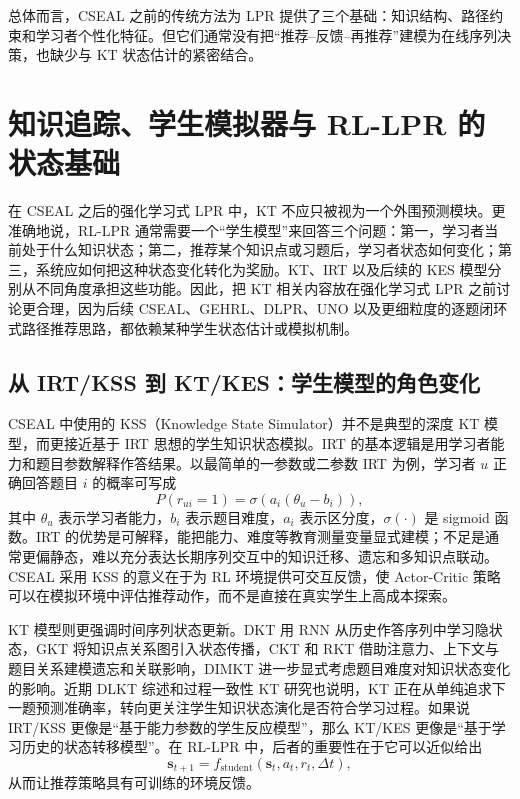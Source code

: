 \documentclass[UTF8,a4paper,zihao=-4]{ctexart}
\begin{document}
总体而言，CSEAL 之前的传统方法为 LPR 提供了三个基础：知识结构、路径约束和学习者个性化特征。但它们通常没有把“推荐--反馈--再推荐”建模为在线序列决策，也缺少与 KT 状态估计的紧密结合。

\section{知识追踪、学生模拟器与 RL-LPR 的状态基础}

在 CSEAL 之后的强化学习式 LPR 中，KT 不应只被视为一个外围预测模块。更准确地说，RL-LPR 通常需要一个“学生模型”来回答三个问题：第一，学习者当前处于什么知识状态；第二，推荐某个知识点或习题后，学习者状态如何变化；第三，系统应如何把这种状态变化转化为奖励。KT、IRT 以及后续的 KES 模型分别从不同角度承担这些功能。因此，把 KT 相关内容放在强化学习式 LPR 之前讨论更合理，因为后续 CSEAL、GEHRL、DLPR、UNO 以及更细粒度的逐题闭环式路径推荐思路，都依赖某种学生状态估计或模拟机制。

\subsection{从 IRT/KSS 到 KT/KES：学生模型的角色变化}

CSEAL 中使用的 KSS（Knowledge State Simulator）并不是典型的深度 KT 模型，而更接近基于 IRT 思想的学生知识状态模拟。IRT 的基本逻辑是用学习者能力和题目参数解释作答结果。以最简单的一参数或二参数 IRT 为例，学习者 $u$ 正确回答题目 $i$ 的概率可写成
\begin{equation}
P(r_{ui}=1)=\sigma(a_i(\theta_u-b_i)),
\end{equation}
其中 $\theta_u$ 表示学习者能力，$b_i$ 表示题目难度，$a_i$ 表示区分度，$\sigma(\cdot)$ 是 sigmoid 函数。IRT 的优势是可解释，能把能力、难度等教育测量变量显式建模；不足是通常更偏静态，难以充分表达长期序列交互中的知识迁移、遗忘和多知识点联动。CSEAL 采用 KSS 的意义在于为 RL 环境提供可交互反馈，使 Actor-Critic 策略可以在模拟环境中评估推荐动作，而不是直接在真实学生上高成本探索。

KT 模型则更强调时间序列状态更新。DKT 用 RNN 从历史作答序列中学习隐状态\cite{Piech2015DKT}，GKT 将知识点关系图引入状态传播\cite{Nakagawa2019GKT}，CKT 和 RKT 借助注意力、上下文与题目关系建模遗忘和关联影响\cite{Ghosh2020CKT,Pandey2020RKT}，DIMKT 进一步显式考虑题目难度对知识状态变化的影响\cite{Shen2022DIMKT}。近期 DLKT 综述和过程一致性 KT 研究也说明，KT 正在从单纯追求下一题预测准确率，转向更关注学生知识状态演化是否符合学习过程\cite{Liu2025DLKTReview,Shen2024LPKT}。如果说 IRT/KSS 更像是“基于能力参数的学生反应模型”，那么 KT/KES 更像是“基于学习历史的状态转移模型”。在 RL-LPR 中，后者的重要性在于它可以近似给出
\begin{equation}
\mathbf{s}_{t+1}=f_{\mathrm{student}}(\mathbf{s}_t,a_t,r_t,\Delta t),
\end{equation}
从而让推荐策略具有可训练的环境反馈。
\end{document}
